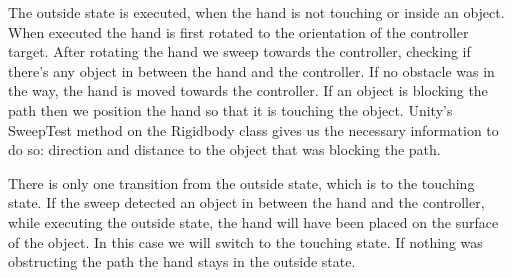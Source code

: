 The outside state is executed, when the hand is not touching or inside an object. When executed the hand is first rotated to the orientation of the controller target. After rotating the hand we sweep towards the controller, checking if there’s any object in between the hand and the controller. If no obstacle was in the way, the hand is moved towards the controller. If an object is blocking the path then we position the hand so that it is touching the object. Unity’s SweepTest method on the Rigidbody class gives us the necessary information to do so: direction and distance to the object that was blocking the path.

There is only one transition from the outside state, which is to the touching state. If the sweep detected an object in between the hand and the controller, while executing the outside state, the hand will have been placed on the surface of the object. In this case we will switch to the touching state. If nothing was obstructing the path the hand stays in the outside state.

